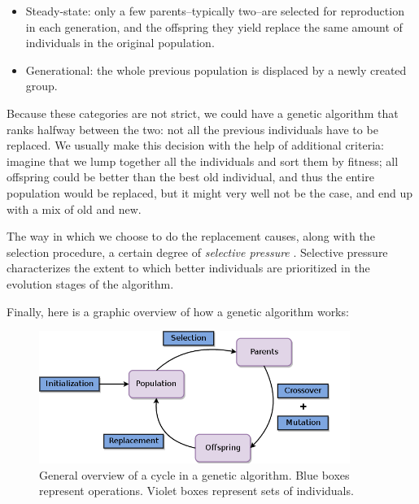 		\begin{itemize}

			\item
			Steady-state: only a few parents--typically two--are selected for reproduction in each generation, and the offspring they yield replace the same amount of individuals in the original population.

			\item
			Generational: the whole previous population is displaced by a newly created group.

		\end{itemize}

		Because these categories are not strict, we could have a genetic algorithm that ranks halfway between the two: not all the previous individuals have to be replaced. We usually make this decision with the help of additional criteria: imagine that we lump together all the individuals and sort them by fitness; all offspring could be better than the best old individual, and thus the entire population would be replaced, but it might very well not be the case, and end up with a mix of old and new.

		The way in which we choose to do the replacement causes, along with the selection procedure, a certain degree of \textit{selective pressure} \cite{selection-ga}. Selective pressure characterizes the extent to which better individuals are prioritized in the evolution stages of the algorithm.

		Finally, here is a graphic overview of how a genetic algorithm works:

		\vspace{0.2cm}

	    \begin{figure}[bth]

	        \myfloatalign
	        \includegraphics[width=0.9\textwidth]{gfx/GeneticAlgorithm.png}
	        \caption{General overview of a cycle in a genetic algorithm. Blue boxes represent operations. Violet boxes represent sets of individuals.}

	    \end{figure}

